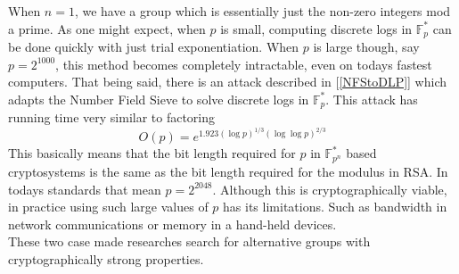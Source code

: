 When $n = 1$, we have a group which is essentially just the non-zero integers mod a prime. As one might expect, when $p$ is small, computing discrete logs in $\mathbb{F}_p^*$ can be done quickly with just trial exponentiation. When $p$ is large though, say $p = 2^{1000}$, this method becomes completely intractable, even on todays fastest computers. That being said, there is an attack described in [\ref{NFStoDLP}] which adapts the Number Field Sieve to solve discrete logs in $\mathbb{F}_p^*$. This attack has running time very similar to factoring $$O(p) = e^{1.923(\log p)^{1/3}(\log\log p)^{2/3}}$$ This basically means that the bit length required for $p$ in $\mathbb{F}_{p^n}^*$ based cryptosystems is the same as the bit length required for the modulus in RSA. In todays standards that mean $p = 2^{2048}$. Although this is cryptographically viable, in practice using such large values of $p$ has its limitations. Such as bandwidth in network communications or memory in a hand-held devices. \\

These two case made researches search for alternative groups with cryptographically strong properties. 








